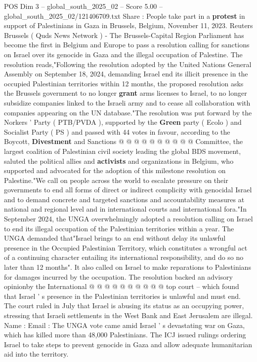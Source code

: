 \begin{textsample}{POS Dim 3 – global\_south\_2025\_02 – Score 5.00 – global\_south\_2025\_02/121406709.txt}  \label{ex:f3_pos_418}
Share : People take part in a \textbf{protest} in support of Palestinians in Gaza in Brussels, Belgium, November 11, 2023.
Reuters Brussels ( Quds News Network ) - The Brussels-Capital Region Parliament has become the first in Belgium and Europe to pass a resolution calling for sanctions on Israel over its genocide in Gaza and the illegal occupation of Palestine.
The resolution reads,"Following the resolution adopted by the United Nations General Assembly on September 18, 2024, demanding Israel end its illicit presence in the occupied Palestinian territories within 12 months, the proposed resolution asks the Brussels government to no longer \textbf{grant} arms licenses to Israel, to no longer subsidize companies linked to the Israeli army and to cease all collaboration with companies appearing on the UN database."The resolution was put forward by the Norkers ' Party ( PTB/PVDA ), supported by the \textbf{Green} party ( Ecolo ) and Socialist Party ( PS ) and passed with 44 votes in favour, according to the Boycott, \textbf{Divestment} and Sanctions @ @ @ @ @ @ @ @ @ @ Committee, the largest coalition of Palestinian civil society leading the global BDS movement, saluted the political allies and \textbf{activists} and organizations in Belgium, who supported and advocated for the adoption of this milestone resolution on Palestine."We call on people across the world to escalate pressure on their governments to end all forms of direct or indirect complicity with genocidal Israel and to demand concrete and targeted sanctions and accountability measures at national and regional level and in international courts and international fora."In September 2024, the UNGA overwhelmingly adopted a resolution calling on Israel to end its illegal occupation of the Palestinian territories within a year.
The UNGA demanded that"Israel brings to an end without delay its unlawful presence in the Occupied Palestinian Territory, which constitutes a wrongful act of a continuing character entailing its international responsibility, and do so no later than 12 months".
It also called on Israel to make reparations to Palestinians for damages incurred by the occupation.
The resolution backed an advisory opinionby the International @ @ @ @ @ @ @ @ @ @ top court -- which found that Israel ' s presence in the Palestinian territories is unlawful and must end.
The court ruled in July that Israel is abusing its status as an occupying power, stressing that Israeli settlements in the West Bank and East Jerusalem are illegal.
Name : Email : The UNGA vote came amid Israel ' s devastating war on Gaza, which has killed more than 48,000 Palestinians.
The ICJ issued rulings ordering Israel to take steps to prevent genocide in Gaza and allow adequate humanitarian aid into the territory.

\end{textsample}

